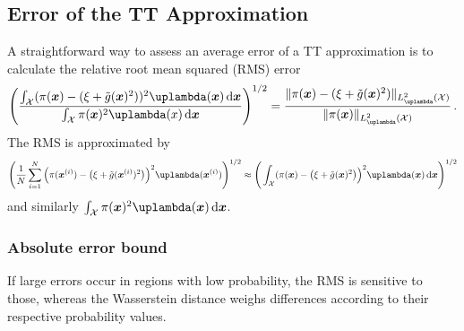 \subsection{Error of the TT Approximation}
A straightforward way to assess an average error of a TT approximation is to calculate the relative root mean squared (RMS) error 
\begin{align}
	\Bigg( \frac{ \int_{\mathcal{X}} (\pi(\bm{x}) - (\xi + \tilde{g}(\bm{x})^2))^2 \uplambda(\bm{x}) \diff \bm{x}}{ \int_{\mathcal{X}} \pi(\bm{x})^2 \uplambda(x)  \diff \bm{x} } \Bigg)^{1/2} =	\frac{\lVert 	\pi(\bm{x}) - (\xi + \tilde{g}(\bm{x})^2)  \rVert_{L^2_{\uplambda}(\mathcal{X})}}{\lVert 	\pi(\bm{x}) \rVert_{L^2_{\uplambda}(\mathcal{X})}  } \, .
\end{align}
The RMS is approximated by
\begin{align}
	\Bigg( \frac{1}{N} \sum^{N}_{i =1} \Big(\pi(\bm{x}^{(i)}) - \big(\xi + \tilde{g}(\bm{x}^{(i)})^2\big)\Big)^2 \uplambda(\bm{x}^{(i)})\Bigg)^{1/2}    \approx \Bigg(  \int_{\mathcal{X}} (\pi(\bm{x}) - \big(\xi + \tilde{g}(\bm{x})^2\big)\Big)^2 \uplambda(\bm{x}) \diff \bm{x} \Bigg)^{1/2} \label{eq:RMSTT}
\end{align}
and similarly $\int_{\mathcal{X}} \pi(\bm{x})^2 \uplambda(\bm{x})  \diff \bm{x}$.


\subsubsection{Absolute error bound}
\label{subsec:wasser}
If large errors occur in regions with low probability, the RMS is sensitive to those, whereas the Wasserstein distance weighs differences according to their respective probability values.

